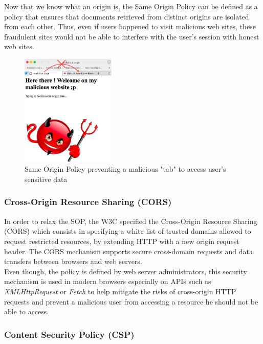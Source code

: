 \documentclass[journal]{IEEEtran}
\begin{document}
\medskip

Now that we know what an origin is, the Same Origin Policy can be defined as a policy that ensures that documents retrieved from distinct origins are isolated from each other. Thus, even if users happened to visit malicious web sites, these fraudulent sites would not be able to interfere with the user's session with honest web sites.

\begin{figure}[h]
\centering
\includegraphics[width=0.4\textwidth]{images/SOPTabs.png}
\caption{Same Origin Policy preventing a malicious "tab" to access user's sensitive data}
\label{fig:SOPTabs}
\end{figure}

\subsubsection{Cross-Origin Resource Sharing (CORS)}
\label{CORSSection}

In order to relax the SOP, the W3C specified the Cross-Origin Resource Sharing (CORS) which consists in specifying a white-list of trusted domains allowed to request restricted resources, by extending HTTP with a new origin request header. The CORS mechanism supports secure cross-domain requests and data transfers between browsers and web servers. \\

Even though, the policy is defined by web server administrators, this security mechanism is used in modern browsers especially on APIs such as \emph{XMLHttpRequest} or \emph{Fetch} to help mitigate the risks of cross-origin HTTP requests and prevent a malicious user from accessing a resource he should not be able to access.

\subsubsection{Content Security Policy (CSP)}
\end{document}

